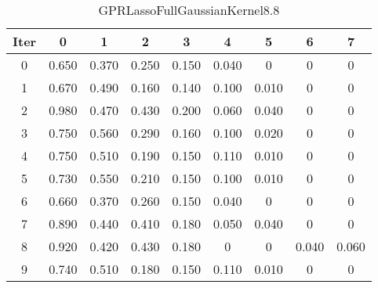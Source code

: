 \begin{table}
	\begin{center}
		\begin{tabular}{|c|c|c|c|c|c|c|c|c|}
			\hline
			Iter & 0 & 1 & 2 & 3 & 4 & 5 & 6 & 7 \\
			\hline
			0 & 0.650 & 0.370 & 0.250 & 0.150 & 0.040 & 0 & 0 & 0 \\
			\hline
			1 & 0.670 & 0.490 & 0.160 & 0.140 & 0.100 & 0.010 & 0 & 0 \\
			\hline
			2 & 0.980 & 0.470 & 0.430 & 0.200 & 0.060 & 0.040 & 0 & 0 \\
			\hline
			3 & 0.750 & 0.560 & 0.290 & 0.160 & 0.100 & 0.020 & 0 & 0 \\
			\hline
			4 & 0.750 & 0.510 & 0.190 & 0.150 & 0.110 & 0.010 & 0 & 0 \\
			\hline
			5 & 0.730 & 0.550 & 0.210 & 0.150 & 0.100 & 0.010 & 0 & 0 \\
			\hline
			6 & 0.660 & 0.370 & 0.260 & 0.150 & 0.040 & 0 & 0 & 0 \\
			\hline
			7 & 0.890 & 0.440 & 0.410 & 0.180 & 0.050 & 0.040 & 0 & 0 \\
			\hline
			8 & 0.920 & 0.420 & 0.430 & 0.180 & 0 & 0 & 0.040 & 0.060 \\
			\hline
			9 & 0.740 & 0.510 & 0.180 & 0.150 & 0.110 & 0.010 & 0 & 0 \\
			\hline
		\end{tabular}
	\end{center}
	\caption{GPRLassoFullGaussianKernel8.8}
\end{table}